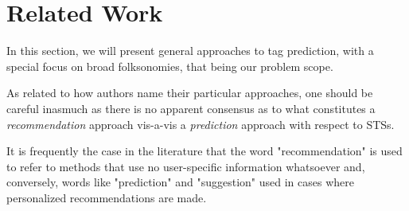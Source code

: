 \chapter{Related Work}\label{chap:related_work}


In this section, we will present general approaches to tag prediction, with a special focus on broad folksonomies, that being our problem scope.




As related to how authors name their particular approaches, one should be careful inasmuch as there is no apparent consensus as to what constitutes a \textit{recommendation} approach vis-a-vis a \textit{prediction} approach with respect to STSs. 

It is frequently the case in the literature that the word "recommendation" is used to refer to methods that use no user-specific information whatsoever and, conversely, words like "prediction" and "suggestion" used in cases where personalized recommendations are made.







